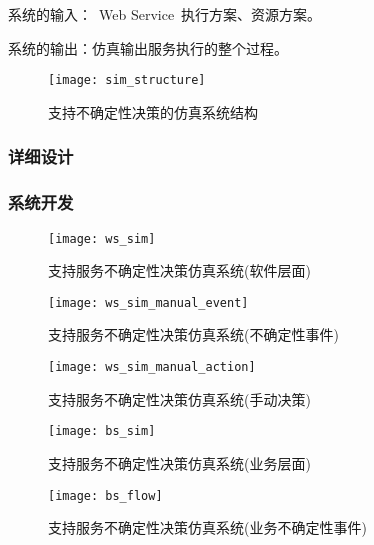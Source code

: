系统的输入：~Web Service~执行方案、资源方案。

系统的输出：仿真输出服务执行的整个过程。

\begin{figure}[htbp]
    \centering
    \texttt{[image: sim\_structure]}
    \caption{支持不确定性决策的仿真系统结构}\label{figure:sim_structure}
    \vspace{-1em}
\end{figure}

\subsubsection{详细设计}


\subsubsection{系统开发}

\begin{figure}[htbp]
    \centering
    \texttt{[image: ws\_sim]}
    \caption{支持服务不确定性决策仿真系统(软件层面)}\label{figure:ws_sim}
    \vspace{-1em}
\end{figure}

\begin{figure}[htbp]
    \centering
    \texttt{[image: ws\_sim\_manual\_event]}
    \caption{支持服务不确定性决策仿真系统(不确定性事件)}\label{figure:ws_sim_manual_event}
    \vspace{-1em}
\end{figure}


\begin{figure}[htbp]
    \centering
    \texttt{[image: ws\_sim\_manual\_action]}
    \caption{支持服务不确定性决策仿真系统(手动决策)}\label{figure:ws_sim_manual_action}
    \vspace{-1em}
\end{figure}


\begin{figure}[htbp]
    \centering
    \texttt{[image: bs\_sim]}
    \caption{支持服务不确定性决策仿真系统(业务层面)}\label{figure:bs_sim}
    \vspace{-1em}
\end{figure}

\begin{figure}[htbp]
    \centering
    \texttt{[image: bs\_flow]}
    \caption{支持服务不确定性决策仿真系统(业务不确定性事件)}\label{figure:bs_flow}
    \vspace{-1em}
\end{figure}


